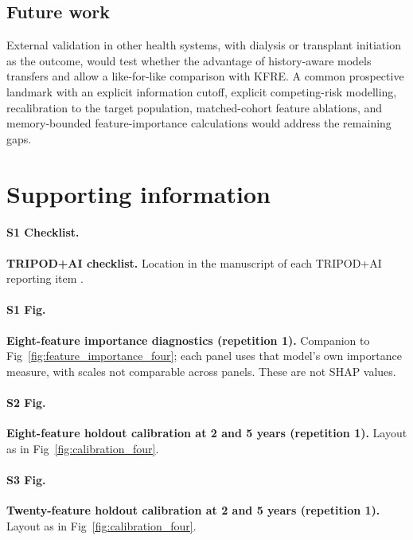 \documentclass[10pt,letterpaper]{article}
\begin{document}
\subsection*{Future work}
External validation in other health systems, with dialysis or transplant initiation as the outcome, would test whether the advantage of history-aware models transfers and allow a like-for-like comparison with KFRE. A common prospective landmark with an explicit information cutoff, explicit competing-risk modelling, recalibration to the target population, matched-cohort feature ablations, and memory-bounded feature-importance calculations would address the remaining gaps.


\section*{Supporting information}

\paragraph*{S1 Checklist.}
\label{S1_Checklist}
\textbf{TRIPOD+AI checklist.} Location in the manuscript of each TRIPOD+AI reporting item \cite{collins2024tripodai}.

\paragraph*{S1 Fig.}
\label{S1_Fig}
\textbf{Eight-feature importance diagnostics (repetition 1).} Companion to Fig~\ref{fig:feature_importance_four}; each panel uses that model's own importance measure, with scales not comparable across panels. These are not SHAP values.

\paragraph*{S2 Fig.}
\label{S2_Fig}
\textbf{Eight-feature holdout calibration at 2 and 5 years (repetition 1).} Layout as in Fig~\ref{fig:calibration_four}.

\paragraph*{S3 Fig.}
\label{S3_Fig}
\textbf{Twenty-feature holdout calibration at 2 and 5 years (repetition 1).} Layout as in Fig~\ref{fig:calibration_four}.
\end{document}
